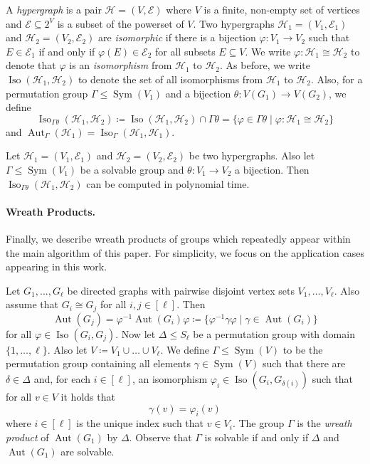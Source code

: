 \documentclass{theoretics}
\newcommand{\CE}{{\mathcal E}}
\newcommand{\CH}{{\mathcal H}}
\DeclareMathOperator{\Aut}{Aut}
\DeclareMathOperator{\Iso}{Iso}
\DeclareMathOperator{\Sym}{Sym}
\begin{document}
A \emph{hypergraph} is a pair $\CH = (V,\CE)$ where $V$ is a finite, non-empty set of vertices and $\CE \subseteq 2^V$ is a subset of the powerset of $V$.
Two hypergraphs $\CH_1 = (V_1,\CE_1)$ and $\CH_2 = (V_2,\CE_2)$ are \emph{isomorphic} if there is a bijection $\varphi\colon V_1 \to V_2$ such that $E \in \CE_1$ if and only if $\varphi(E) \in \CE_2$ for all subsets $E \subseteq V$.
We write $\varphi\colon \CH_1 \cong \CH_2$ to denote that $\varphi$ is an \emph{isomorphism} from $\CH_1$ to $\CH_2$.
As before, we write $\Iso(\CH_1,\CH_2)$ to denote the set of all isomorphisms from $\CH_1$ to $\CH_2$.
Also, for a permutation group $\Gamma \leq \Sym(V_1)$ and a bijection $\theta\colon V(G_1) \to V(G_2)$,
we define
\[\Iso_{\Gamma\theta}(\CH_1,\CH_2) \coloneqq \Iso(\CH_1,\CH_2) \cap \Gamma\theta = \{\varphi \in \Gamma\theta \mid \varphi\colon \CH_1 \cong \CH_2\}\]
and $\Aut_\Gamma(\CH_1) = \Iso_\Gamma(\CH_1,\CH_1)$.

\begin{theorem}
 \label{thm:hi-solvable-group}
 Let $\CH_1 = (V_1,\CE_1)$ and $\CH_2 = (V_2,\CE_2)$ be two hypergraphs.
 Also let $\Gamma \leq \Sym(V_1)$ be a solvable group and $\theta\colon V_1 \to V_2$ a bijection.
 Then $\Iso_{\Gamma\theta}(\CH_1,\CH_2)$ can be computed in polynomial time.
\end{theorem}

\paragraph{Wreath Products.}

Finally, we describe wreath products of groups which repeatedly appear within the main algorithm of this paper.
For simplicity, we focus on the application cases appearing in this work.

Let $G_1,\dots,G_\ell$ be directed graphs with pairwise disjoint vertex sets $V_1,\dots,V_\ell$.
Also assume that $G_i \cong G_j$ for all $i,j \in [\ell]$.
Then
\[\Aut(G_j) = \varphi^{-1}\Aut(G_i)\varphi \coloneqq \{\varphi^{-1}\gamma\varphi \mid \gamma \in \Aut(G_i)\}\]
for all $\varphi \in \Iso(G_i,G_j)$.
Now let $\Delta \leq S_\ell$ be a permutation group with domain $\{1,\dots,\ell\}$.
Also let $V \coloneqq V_1 \cup \dots \cup V_\ell$.
We define $\Gamma \leq \Sym(V)$ to be the permutation group containing all elements $\gamma \in \Sym(V)$ such that there are $\delta \in \Delta$ and, for each $i \in [\ell]$, an isomorphism $\varphi_i \in \Iso(G_i,G_{\delta(i)})$ such that for all $v \in V$ it holds that
\[\gamma(v) = \varphi_i(v)\]
where $i \in [\ell]$ is the unique index such that $v \in V_i$.
The group $\Gamma$ is the \emph{wreath product} of $\Aut(G_1)$ by $\Delta$.
Observe that $\Gamma$ is solvable if and only if $\Delta$ and $\Aut(G_1)$ are solvable.
\end{document}
